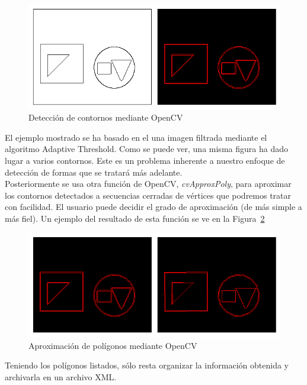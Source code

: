 {		\begin{figure}[htbp]
		\centering
		\includegraphics[scale=0.47]{graphics/contourdetection.png}
		\caption{Detección de contornos mediante OpenCV}
		\label{fig:findcontours}
		\end{figure}
		
	El ejemplo mostrado se ha basado en el una imagen filtrada mediante el algoritmo Adaptive Threshold. Como se puede ver, una misma figura ha dado lugar a varios contornos. Este es un problema inherente a nuestro enfoque de detección de formas que se tratará más adelante.\\
	
	Posteriormente se usa otra función de OpenCV, \emph{cvApproxPoly}, para aproximar los contornos detectados a secuencias cerradas de vértices que podremos tratar con facilidad. El usuario puede decidir el grado de aproximación (de más simple a más fiel). Un ejemplo del resultado de esta función se ve en la Figura~\ref{fig:aproxpoly}\\
	
		\begin{figure}[htbp]
		\centering
		\includegraphics[scale=0.47]{graphics/aproxpoly.png}
		\caption{Aproximación de polígonos mediante OpenCV}
		\label{fig:aproxpoly}
		\end{figure}
				
	Teniendo los polígonos listados, sólo resta organizar la información obtenida y archivarla en un archivo XML.\\
	
}
